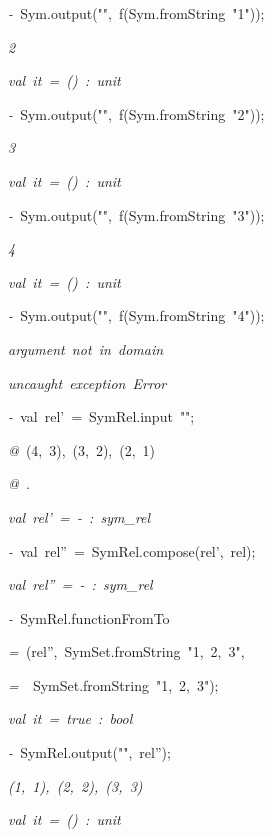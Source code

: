 \begin{list}{}
\item[]\textsl{-\ }Sym.output("",\ f(Sym.fromString\ "1"));
\item[]\textsl{2}
\item[]\textsl{val\ it\ =\ ()\ :\ unit}
\item[]\textsl{-\ }Sym.output("",\ f(Sym.fromString\ "2"));
\item[]\textsl{3}
\item[]\textsl{val\ it\ =\ ()\ :\ unit}
\item[]\textsl{-\ }Sym.output("",\ f(Sym.fromString\ "3"));
\item[]\textsl{4}
\item[]\textsl{val\ it\ =\ ()\ :\ unit}
\item[]\textsl{-\ }Sym.output("",\ f(Sym.fromString\ "4"));
\item[]\textsl{argument\ not\ in\ domain}
\item[]
\item[]\textsl{uncaught\ exception\ Error}
\item[]\textsl{-\ }val\ rel'\ =\ SymRel.input\ "";
\item[]\textsl{@\ }(4,\ 3),\ (3,\ 2),\ (2,\ 1)
\item[]\textsl{@\ }.
\item[]\textsl{val\ rel'\ =\ -\ :\ sym_rel}
\item[]\textsl{-\ }val\ rel''\ =\ SymRel.compose(rel',\ rel);
\item[]\textsl{val\ rel''\ =\ -\ :\ sym_rel}
\item[]\textsl{-\ }SymRel.functionFromTo
\item[]\textsl{=\ }(rel'',\ SymSet.fromString\ "1,\ 2,\ 3",
\item[]\textsl{=\ }\ SymSet.fromString\ "1,\ 2,\ 3");
\item[]\textsl{val\ it\ =\ true\ :\ bool}
\item[]\textsl{-\ }SymRel.output("",\ rel'');
\item[]\textsl{(1,\ 1),\ (2,\ 2),\ (3,\ 3)}
\item[]\textsl{val\ it\ =\ ()\ :\ unit}
\end{list}
